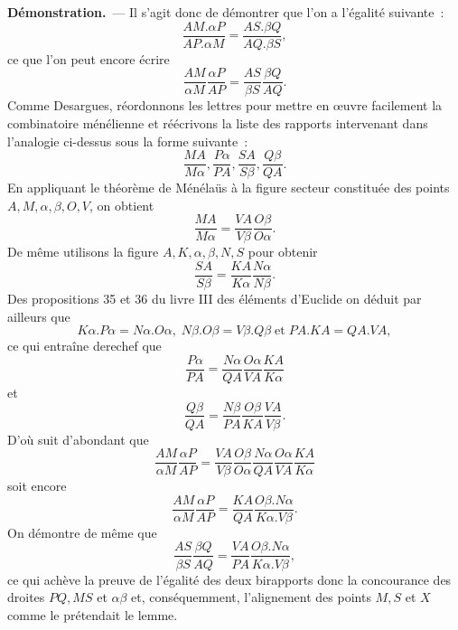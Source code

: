 \documentclass[12pt, a4paper]{article}
\newenvironment{demonstration}{\begin{trivlist}\item[]{\textbf{D\'emonstration.}}~---}%
{\nolinebreak  \end{trivlist}}
\begin{document}
\begin{demonstration}
Il s'agit donc de démontrer que l'on a l'égalité suivante~:~
\[
\frac{AM.\alpha P}{AP.\alpha M}=\frac{AS.\beta Q}{AQ.\beta S},
\]
ce que l'on peut encore écrire
\[
\frac{AM}{\alpha M}\frac{\alpha P}{AP}=\frac{AS}{\beta S}\frac{\beta Q}{AQ}.
\]
Comme Desargues, réordonnons les lettres pour mettre en {\oe}uvre facilement la combinatoire ménélienne et réécrivons la liste des rapports intervenant dans l'analogie ci-dessus sous la forme suivante~:~
\[
\frac{MA}{M\alpha},\frac{P\alpha}{PA},\frac{SA}{S\beta},\frac{Q\beta}{QA} .
\]
En appliquant le théorème de Ménélaüs à la figure secteur constituée des points $A,M,\alpha,\beta,O,V$, on obtient
\[
\frac{MA}{M\alpha}=\frac{VA}{V\beta}\frac{O\beta}{O\alpha}.
\]
De même utilisons la figure $A,K,\alpha,\beta,N,S$ pour obtenir
\[
\frac{SA}{S\beta}=\frac{KA}{K\alpha}\frac{N\alpha}{N\beta}.
\]
Des propositions 35 et 36 du livre III des éléments d'Euclide on déduit par ailleurs que
\[
K\alpha.P\alpha=N\alpha.O\alpha,\; N\beta.O\beta=V\beta.Q\beta\;\mbox{et}\;PA.KA=QA.VA,
\]
ce qui entraîne derechef que
\[
\frac{P\alpha}{PA}=\frac{N\alpha}{QA}\frac{O\alpha}{VA}\frac{KA}{K\alpha}
\]
et
\[
\frac{Q\beta}{QA}=\frac{N\beta}{PA}\frac{O\beta}{KA}\frac{VA}{V\beta}.
\]
D'où suit d'abondant que
\[
\frac{AM}{\alpha M}\frac{\alpha P}{AP}=\frac{VA}{V\beta}\frac{O\beta}{O\alpha}\frac{N\alpha}{QA}\frac{O\alpha}{VA}\frac{KA}{K\alpha}
\]
soit encore
\[
\frac{AM}{\alpha M}\frac{\alpha P}{AP}=\frac{KA}{QA}\frac{O\beta.N\alpha}{K\alpha.V\beta}.
\]
On démontre de même que
\[
\frac{AS}{\beta S}\frac{\beta Q}{AQ}=\frac{VA}{PA}\frac{O\beta.N\alpha}{K\alpha.V\beta},
\]
ce qui achève la preuve de l'égalité des deux birapports donc la concourance des droites $PQ,MS$ et $\alpha\beta$ et, conséquemment, l'alignement des points $M,S$ et $X$ comme le prétendait le lemme.
\end{demonstration}
\end{document}
